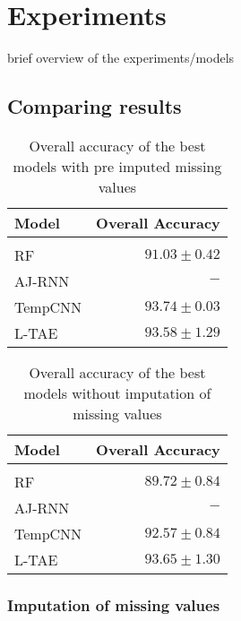 \section{Experiments}
brief overview of the experiments/models


\pagebreak

\pagebreak

\pagebreak

\pagebreak


\subsection{Comparing results}

\begin{table}[!htbp]
  \centering
    \begin{tabular}{lr}
    Model                       & Overall Accuracy             \\[0.2cm] 
    \hline \\[-0.2cm]
    RF      & $91.03 \pm 0.42$\\
    AJ-RNN & $-$\\
    TempCNN & $93.74 \pm 0.03$\\
    L-TAE   & $93.58 \pm 1.29$
    \end{tabular}
  \caption{Overall accuracy of the best models with pre imputed missing values}
  \label{tab:ALLresultsImputed} 
\end{table}

\begin{table}[!htbp]
  \centering
    \begin{tabular}{lr}
    Model                       & Overall Accuracy             \\[0.2cm] 
    \hline \\[-0.2cm]
    RF      & $89.72 \pm 0.84$\\
    AJ-RNN & $-$\\
    TempCNN & $92.57 \pm 0.84$\\
    L-TAE   & $93.65 \pm 1.30$
    \end{tabular}
  \caption{Overall accuracy of the best models without imputation of missing values} 
  \label{tab:ALLresultsNoImputed}
\end{table}

\subsubsection{Imputation of missing values}

